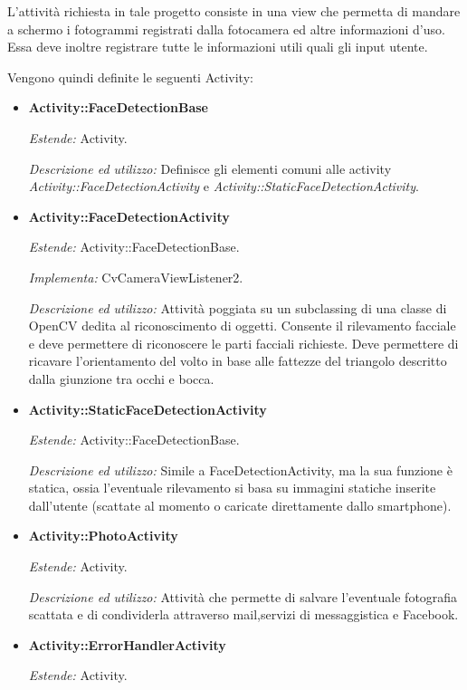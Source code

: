 L'attività richiesta in tale progetto consiste in una view che permetta di mandare a schermo i fotogrammi registrati dalla fotocamera ed altre informazioni d'uso. Essa deve inoltre registrare tutte le informazioni utili quali gli input utente.

Vengono quindi definite le seguenti Activity:
\begin{itemize}

\item \textbf{Activity::FaceDetectionBase}

\textit{Estende:} Activity.

\textit{Descrizione ed utilizzo:} Definisce gli elementi comuni alle activity \textit{Activity::FaceDetectionActivity} e \textit{Activity::StaticFaceDetectionActivity}.


\item \textbf{Activity::FaceDetectionActivity}

\textit{Estende:} Activity::FaceDetectionBase.

\textit{Implementa:} CvCameraViewListener2.

\textit{Descrizione ed utilizzo:} Attività poggiata su un subclassing di una classe di OpenCV dedita al riconoscimento di oggetti. Consente il rilevamento facciale e deve permettere di riconoscere le parti facciali richieste. Deve permettere di ricavare l'orientamento del volto in base alle fattezze del triangolo descritto dalla giunzione tra occhi e bocca.

\item \textbf{Activity::StaticFaceDetectionActivity}

\textit{Estende:} Activity::FaceDetectionBase.

\textit{Descrizione ed utilizzo:} Simile a FaceDetectionActivity, ma la sua funzione è statica, ossia l'eventuale rilevamento si basa su immagini statiche inserite dall'utente (scattate al momento o caricate direttamente dallo smartphone).

\item \textbf{Activity::PhotoActivity}

\textit{Estende:} Activity.

\textit{Descrizione ed utilizzo:} Attività che permette di salvare l'eventuale fotografia scattata e di condividerla attraverso mail,servizi di messaggistica e Facebook.

\item \textbf{Activity::ErrorHandlerActivity}

\textit{Estende:} Activity.


\end{itemize}
